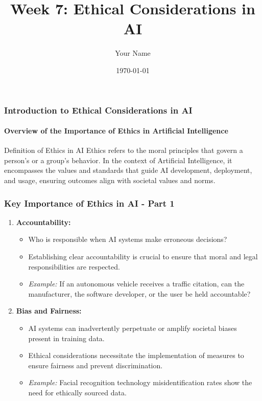 \documentclass{beamer}
\title{Week 7: Ethical Considerations in AI}
\author{Your Name}
\institute{Your Institution}
\date{\today}
\begin{document}
\frame{\titlepage}

\begin{frame}[fragile]
    \frametitle{Introduction to Ethical Considerations in AI}
    \framesubtitle{Overview of the Importance of Ethics in Artificial Intelligence}
    
    \begin{block}{Definition of Ethics in AI}
        Ethics refers to the moral principles that govern a person's or a group’s behavior. In the context of Artificial Intelligence, it encompasses the values and standards that guide AI development, deployment, and usage, ensuring outcomes align with societal values and norms.
    \end{block}
\end{frame}

\begin{frame}[fragile]
    \frametitle{Key Importance of Ethics in AI - Part 1}
    
    \begin{enumerate}
        \item \textbf{Accountability:}
            \begin{itemize}
                \item Who is responsible when AI systems make erroneous decisions?
                \item Establishing clear accountability is crucial to ensure that moral and legal responsibilities are respected.
                \item \textit{Example:} If an autonomous vehicle receives a traffic citation, can the manufacturer, the software developer, or the user be held accountable?
            \end{itemize}
        
        \item \textbf{Bias and Fairness:}
            \begin{itemize}
                \item AI systems can inadvertently perpetuate or amplify societal biases present in training data.
                \item Ethical considerations necessitate the implementation of measures to ensure fairness and prevent discrimination.
                \item \textit{Example:} Facial recognition technology misidentification rates show the need for ethically sourced data.
            \end{itemize}
    \end{enumerate}
\end{frame}
\end{document}
